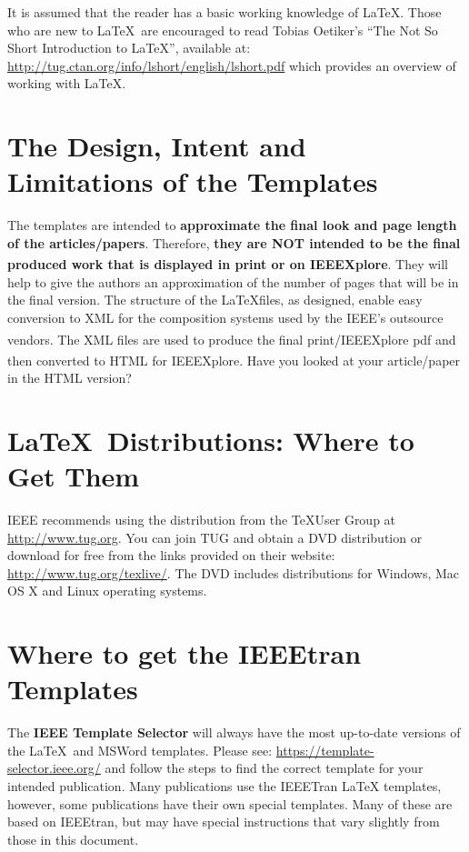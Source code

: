 \documentclass[lettersize,journal]{IEEEtran}
\begin{document}
It is assumed that the reader has a basic working knowledge of \LaTeX. Those who are new to \LaTeX \ are encouraged to read Tobias Oetiker's ``The Not So Short Introduction to \LaTeX '', available at: \url{http://tug.ctan.org/info/lshort/english/lshort.pdf} which provides an overview of working with \LaTeX.   

\section{The Design, Intent and \\ Limitations of the Templates}
\noindent The templates are intended to {\bf{approximate the final look and page length of the articles/papers}}. Therefore, {\bf{they are NOT intended to be the final produced work that is displayed in print or on IEEEXplore\textsuperscript{\textregistered}}}. They will help to give the authors an approximation of the number of pages that will be in the final version. The structure of the \LaTeX files, as designed, enable easy conversion to XML for the composition systems used by the IEEE's outsource vendors. The XML files are used to produce the final print/IEEEXplore\textsuperscript{\textregistered} pdf and then converted to HTML for IEEEXplore\textsuperscript{\textregistered}. Have you looked at your article/paper in the HTML version?

\section{\LaTeX \ Distributions: Where to Get Them}
\noindent IEEE recommends using the distribution from the \TeX User Group at \url{http://www.tug.org}. You can join TUG and obtain a DVD distribution or download for free  from the links provided on their website: \url{http://www.tug.org/texlive/}. The DVD includes distributions for Windows, Mac OS X and Linux operating systems.
 
\section{Where to get the IEEEtran Templates}
\noindent The {\bf{IEEE Template Selector}} will always have the most up-to-date versions of the \LaTeX\ and MSWord templates. Please see: \url{https://template-selector.ieee.org/} and follow the steps to find the correct template for your intended publication. Many publications use the IEEETran LaTeX templates, however, some publications have their own special templates. Many of these are  based on IEEEtran, but may have special instructions that vary slightly from those in this document.
\end{document}
